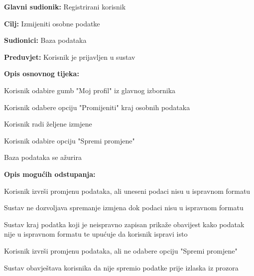 					\noindent {}
					\begin{packed_item}
	
						\item \textbf{Glavni sudionik: } Registrirani korisnik
						\item  \textbf{Cilj:} Izmijeniti osobne podatke
						\item  \textbf{Sudionici:} Baza podataka
						\item  \textbf{Preduvjet:} Korisnik je prijavljen u sustav
						\item  \textbf{Opis osnovnog tijeka:}
						
						\item[] \begin{packed_enum}
							\item Korisnik odabire gumb "Moj profil" iz glavnog izbornika
							\item Korisnik odabere opciju "Promijeniti" kraj osobnih podataka
							\item Korisnik radi željene izmjene
							\item Korisnik odabire opciju "Spremi promjene"
							\item Baza podataka se ažurira
					
						\end{packed_enum}

						\item  \textbf{Opis mogućih odstupanja:}
						
						\item[] \begin{packed_item}
	
							\item[2.a]  Korisnik izvrši promjenu podataka, ali uneseni podaci nisu u ispravnom formatu
							\item[] \begin{packed_enum}
								
								\item Sustav ne dozvoljava spremanje izmjena dok podaci nisu u ispravnom formatu
								\item Sustav kraj podatka koji je neispravno zapisan prikaže obavijest kako podatak nije u ispravnom formatu te upućuje da korisnik ispravi isto
								
							\end{packed_enum}

							\item[2.b]  Korisnik izvrši promjenu podataka, ali ne odabere opciju "Spremi promjene"
							\item[] \begin{packed_enum}
								
								\item Sustav obavještava korisnika da nije spremio podatke prije izlaska iz prozora
								
							\end{packed_enum}
							
						\end{packed_item}
			
					\end{packed_item}

